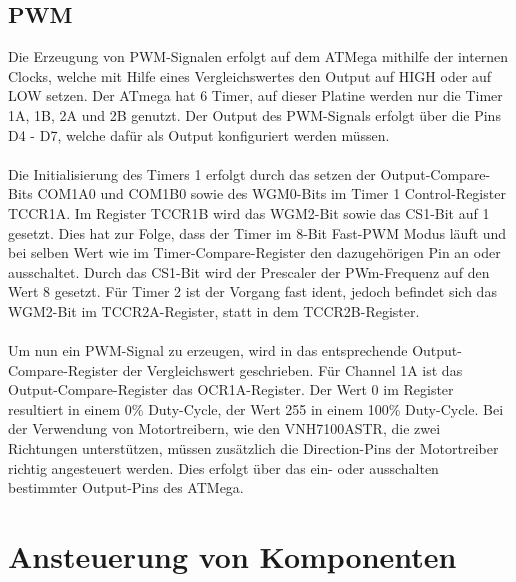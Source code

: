 \documentclass[12pt]{article}
\begin{document}
\subsection{PWM}
Die Erzeugung von PWM-Signalen erfolgt auf dem ATMega mithilfe der internen Clocks, welche mit Hilfe eines Vergleichswertes den Output auf HIGH oder auf LOW setzen. Der ATmega hat 6 Timer, auf dieser Platine werden nur die Timer 1A, 1B, 2A und 2B genutzt. Der Output des PWM-Signals erfolgt über die Pins D4 - D7, welche dafür als Output konfiguriert werden müssen.
\\\\Die Initialisierung des Timers 1 erfolgt durch das setzen der Output-Compare-Bits COM1A0 und COM1B0 sowie des WGM0-Bits im Timer 1 Control-Register TCCR1A. Im Register TCCR1B wird das WGM2-Bit sowie das CS1-Bit auf 1 gesetzt. Dies hat zur Folge, dass der Timer im 8-Bit Fast-PWM Modus läuft und bei selben Wert wie im Timer-Compare-Register den dazugehörigen Pin an oder ausschaltet. Durch das CS1-Bit wird der Prescaler der PWm-Frequenz auf den Wert 8 gesetzt. Für Timer 2 ist der Vorgang fast ident, jedoch befindet sich das WGM2-Bit im TCCR2A-Register, statt in dem TCCR2B-Register.
\\\\Um nun ein PWM-Signal zu erzeugen, wird in das entsprechende Output-Compare-Register der Vergleichswert geschrieben. Für Channel 1A ist das Output-Compare-Register das OCR1A-Register. Der Wert 0 im Register resultiert in einem 0\% Duty-Cycle, der Wert 255 in einem 100\% Duty-Cycle. Bei der Verwendung von Motortreibern, wie den VNH7100ASTR, die zwei Richtungen unterstützen, müssen zusätzlich die Direction-Pins der Motortreiber richtig angesteuert werden. Dies erfolgt über das ein- oder ausschalten bestimmter Output-Pins des ATMega.
\newpage\section{Ansteuerung von Komponenten}
\end{document}
